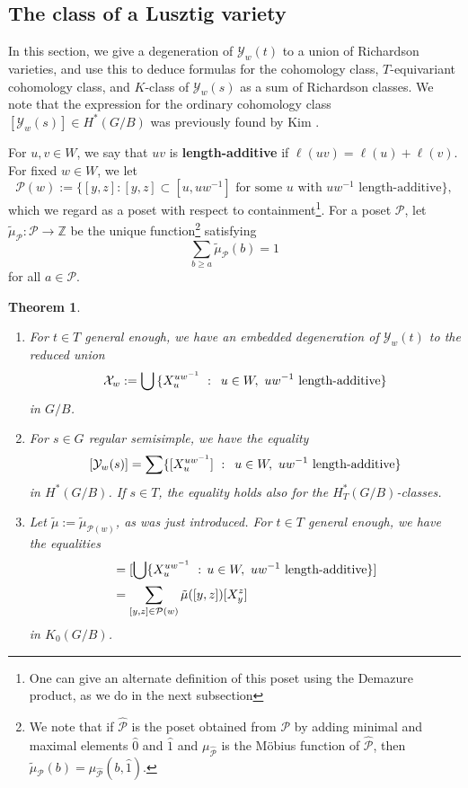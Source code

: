 \documentclass[11pt]{amsart}
\newtheorem{theorem}[Thm]{Theorem}
\theoremstyle{definition}
\newcommand{\ZZ}{\mathbb{Z}}
\newcommand\defn[1]{{\bf #1}}
\def\calP{\mathcal{P}}
\def\calX{\mathcal{X}}
\def\mob{\tilde{\mu}}
\newcommand\calY{{\mathcal Y}}
\renewcommand{\colon}{\mathrel{:}}
\renewcommand{\colon}{:\mkern\thinmuskip}
\begin{document}
\subsection{The class of a Lusztig variety}\label{ssec:class-of-lusztig-var}

In this section, we give a degeneration of $\calY_w(t)$ to a union of
Richardson varieties, and use this to deduce formulas for the
cohomology class, $T$-equivariant cohomology class, and $K$-class of $\calY_w(s)$ as a
sum of Richardson classes. We note that the expression for the ordinary
cohomology class $[\calY_w(s)] \in H^*(G/B)$ was previously found by
Kim \cite[Theorem 4.12]{K20-deligne-lusztig}.

For $u, v \in W$, we say that $uv$ is \defn{length-additive} if $\ell(uv)=\ell(u) + \ell(v)$. 
For fixed $w \in W$, we let 
\[
  \calP(w):=\{[y, z]: [y,z] \subset [u, uw^{-1}] \text{ for some $u$ with $uw^{-1}$ length-additive}\},
\]
which we regard as a poset with respect to containment\footnote{One
  can give an alternate definition of this poset using the Demazure
  product, as we do in the next subsection}. For a poset $\calP$, let
$\mob_{\calP}: \calP \to \ZZ$ be the unique function\footnote{We note
  that if $\hat{\calP}$ is the poset obtained from $\calP$ by adding
  minimal and maximal elements $\hat{0}$ and $\hat{1}$ and
  $\mu_{\hat{\calP}}$ is the M\"obius function of $\hat{\calP}$, then
  $\mob_{\calP}(b) = \mu_{\hat{\calP}}(b, \hat{1})$.} satisfying
\[\sum_{b \geq a} \mob_{\calP}(b)=1\]
for all $a \in \calP$.  



\begin{theorem}\label{thm:Hclass}
  \begin{enumerate}
  \item   For $t \in T$ general enough, we have an embedded degeneration of
    $\calY_w(t)$ to the reduced union 
    \[\calX_w:=\bigcup\, \{  X_{u}^{uw^{-1}} \ \colon\
      u \in W, \  uw^{-1} ~\text{length-additive} \}     \]
    in $G/B$.
  \item  For $s \in G$ regular semisimple, we have the equality
    \[[\calY_w(s)] = \sum\{[X_{u}^{uw^{-1}}] \ \colon\
      u \in W, \  uw^{-1} ~\text{length-additive} \} \]
    in $H^*(G/B)$. If $s\in T$, the equality holds also for
    the $H^*_T(G/B)$-classes.
  \item Let $\mob:= \mob_{\calP(w)}$, as was just introduced. For $t \in T$ general enough, 
we have the equalities 
\begin{align*}[\calY_w(t)] &= [\bigcup \{X_{u}^{uw^{-1}}\ \colon 	u \in W, \  uw^{-1} ~\text{length-additive}\}]\\
		  &= \sum_{[y,z] \in \calP(w)} \mob([y,z]) [X_y^z]\end{align*}
		in $K_0(G/B)$. 
              \end{enumerate}
\end{theorem}
\end{document}
